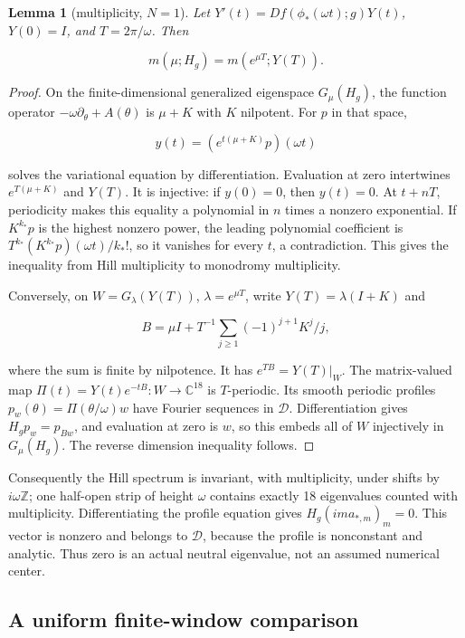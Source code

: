 \documentclass[11pt]{article}
\newtheorem{lemma}{Lemma}[section]
\theoremstyle{definition}
\begin{document}
\begin{lemma}[multiplicity, $N=1$]\label{lem:cg-7-1} Let $Y'(t)=Df(\phi_*(\omega t);g)Y(t)$, $Y(0)=I$, and $T=2\pi/\omega$. Then

\[
 m(\mu;H_g)=m(e^{\mu T};Y(T)).
\]

\end{lemma}

\begin{proof} On the finite-dimensional generalized eigenspace $G_\mu(H_g)$, the function operator $-\omega\partial_\theta+A(\theta)$ is $\mu+K$ with $K$ nilpotent. For $p$ in that space,

\[
 y(t)=(e^{t(\mu+K)}p)(\omega t)
\]

solves the variational equation by differentiation. Evaluation at zero intertwines $e^{T(\mu+K)}$ and $Y(T)$. It is injective: if $y(0)=0$, then $y(t)=0$. At $t+nT$, periodicity makes this equality a polynomial in $n$ times a nonzero exponential. If $K^{k_*}p$ is the highest nonzero power, the leading polynomial coefficient is $T^{k_*}(K^{k_*}p)(\omega t)/k_*!$, so it vanishes for every $t$, a contradiction. This gives the inequality from Hill multiplicity to monodromy multiplicity.

Conversely, on $W=G_\lambda(Y(T))$, $\lambda=e^{\mu T}$, write $Y(T)=\lambda(I+K)$ and

\[
 B=\mu I+T^{-1}\sum_{j\ge1}(-1)^{j+1}K^j/j,
\]

where the sum is finite by nilpotence. It has $e^{TB}=Y(T)|_W$. The matrix-valued map $\Pi(t)=Y(t)e^{-tB}:W\to\mathbb C^{18}$ is $T$-periodic. Its smooth periodic profiles $p_w(\theta)=\Pi(\theta/\omega)w$ have Fourier sequences in $\mathcal D$. Differentiation gives $H_gp_w=p_{Bw}$, and evaluation at zero is $w$, so this embeds all of $W$ injectively in $G_\mu(H_g)$. The reverse dimension inequality follows. \end{proof}

Consequently the Hill spectrum is invariant, with multiplicity, under shifts by $i\omega\mathbb Z$; one half-open strip of height $\omega$ contains exactly 18 eigenvalues counted with multiplicity. Differentiating the profile equation gives $H_g(im a_{*,m})_m=0$. This vector is nonzero and belongs to $\mathcal D$, because the profile is nonconstant and analytic. Thus zero is an actual neutral eigenvalue, not an assumed numerical center.

\subsection{A uniform finite-window comparison}\label{sec:cg-8}
\end{document}
